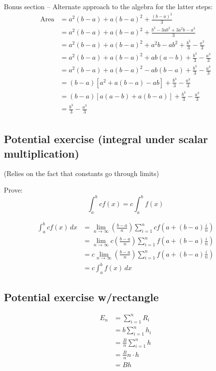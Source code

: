 \documentclass{book}
\begin{document}
Bonus section -- Alternate approach to the algebra for the latter steps:
\begin{align*}
\text{Area} &= a^2(b-a) + a(b-a)^2 + \frac{(b-a)^3}{3} \\
&= a^2(b-a) + a(b-a)^2 + \frac{b^3 - 3ab^2 + 3a^2b - a^3}{3} \\
&= a^2(b-a) + a(b-a)^2 + a^2b - ab^2  + \frac{b^3}{3} - \frac{a^3}{3} \\
&= a^2(b-a) + a(b-a)^2 + ab(a-b)  + \frac{b^3}{3} - \frac{a^3}{3} \\
&= a^2(b-a) + a(b-a)^2 - ab(b-a)  + \frac{b^3}{3} - \frac{a^3}{3} \\
&= (b-a) \left[a^2 + a(b-a) - ab\right]  + \frac{b^3}{3} - \frac{a^3}{3} \\
&= (b-a) \left[a(a-b) + a(b-a)\right]  + \frac{b^3}{3} - \frac{a^3}{3} \\
&= \frac{b^3}{3} - \frac{a^3}{3} \\
\end{align*}

\subsection{Potential exercise (integral under scalar multiplication)}

(Relies on the fact that constants go through limits)

Prove:
\begin{equation}
\int_{a}^{b} cf(x) = c\int_{a}^{b} f(x)
\end{equation}

\begin{align*}
\int_{a}^{b} cf(x)\, dx &= \lim_{n \rightarrow \infty} \left(\frac{b-a}{n}\right) \sum_{i=1}^n cf\left(a + (b-a)\frac{i}{n}\right) \\
&= \lim_{n \rightarrow \infty} c\left(\frac{b-a}{n}\right) \sum_{i=1}^n f\left(a + (b-a)\frac{i}{n}\right) \\
&= c \lim_{n \rightarrow \infty} \left(\frac{b-a}{n}\right) \sum_{i=1}^n f\left(a + (b-a)\frac{i}{n}\right) \\
&= c\int_{a}^{b} f(x)\, dx 
\end{align*}


\subsection{Potential exercise w/rectangle}

\begin{align*}
E_n &= \sum_{i=1}^n R_i \\
&= b \sum_{i=1}^n h_i \\
&= \frac{B}{n} \sum_{i=1}^n h \\
&= \frac{B}{n} n \cdot h \\
&= Bh \\
\end{align*}
\end{document}
